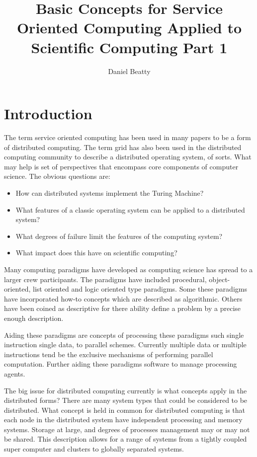 \documentclass[11pt]{article}
\title{Basic Concepts for Service Oriented Computing Applied to Scientific Computing  Part 1}
\author{Daniel Beatty}
\begin{document}
 \maketitle
 
 \section {Introduction}
 The term service oriented computing has been used in many papers to be a form of distributed computing.  The term grid has also been used in the distributed computing community to describe a distributed operating system, of sorts.  What may help is set of perspectives that encompass core components of computer science.  The obvious questions are:
 \begin{itemize}
\item How can distributed systems implement the Turing Machine?
\item What features of a classic operating system can be applied to a distributed system?
\item What degrees of failure limit the features of the computing system?  
\item What impact does this have on scientific computing?
\end{itemize}

Many computing paradigms have developed as computing science has spread to a larger crew participants.  The paradigms have included procedural, object-oriented, list oriented and logic oriented type paradigms.  Some these paradigms have incorporated how-to concepts which are described as algorithmic.  Others have been coined as descriptive for there ability define a problem by a precise enough description.  

Aiding these paradigms are concepts of processing these paradigms such single instruction single data, to parallel schemes.  Currently multiple data or multiple instructions tend be the exclusive mechanisms of performing parallel computation.  Further aiding these paradigms software to manage processing agents.   

The big issue for distributed computing currently is what concepts apply in the distributed forms?    There are many system types that could be considered to be distributed.   What concept is held in common for distributed computing is that each node in the distributed system have independent processing and memory systems.   Storage at large, and degrees of processes management may or may not be shared.  This description allows for a range of systems from a tightly coupled super computer and clusters to globally separated systems.
\end{document}
